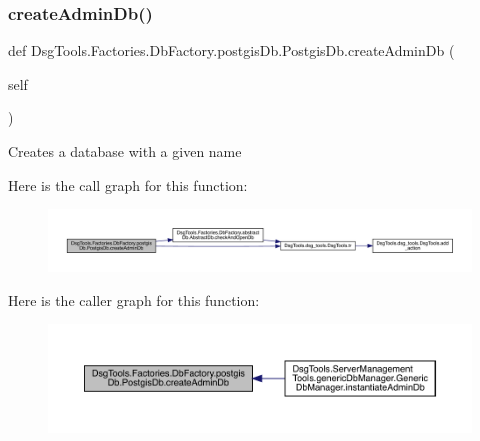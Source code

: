 \subsubsection{\texorpdfstring{create\+Admin\+Db()}{createAdminDb()}}
{\footnotesize\ttfamily def Dsg\+Tools.\+Factories.\+Db\+Factory.\+postgis\+Db.\+Postgis\+Db.\+create\+Admin\+Db (\begin{DoxyParamCaption}\item[{}]{self }\end{DoxyParamCaption})}

\begin{DoxyVerb}Creates a database with a given name
\end{DoxyVerb}
 Here is the call graph for this function\+:
\nopagebreak
\begin{figure}[H]
\begin{center}
\leavevmode
\includegraphics[width=350pt]{class_dsg_tools_1_1_factories_1_1_db_factory_1_1postgis_db_1_1_postgis_db_abb6d0f167872d464d073857cca981dc4_cgraph}
\end{center}
\end{figure}
Here is the caller graph for this function\+:
\nopagebreak
\begin{figure}[H]
\begin{center}
\leavevmode
\includegraphics[width=350pt]{class_dsg_tools_1_1_factories_1_1_db_factory_1_1postgis_db_1_1_postgis_db_abb6d0f167872d464d073857cca981dc4_icgraph}
\end{center}
\end{figure}
\mbox{\label{class_dsg_tools_1_1_factories_1_1_db_factory_1_1postgis_db_1_1_postgis_db_adc158f918b2a4eb2227ff07a6a6987c5}} 
